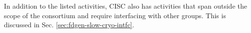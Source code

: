 In addition to the listed activities, CISC also has activities that span
outside the scope of the consortium and require interfacing with other
groups. This is discussed in Sec. \ref{sec:fdgen-slow-cryo-intfc}.

